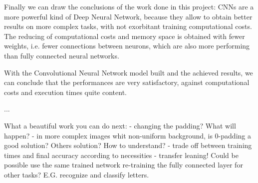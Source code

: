 Finally we can draw the conclusions of the work done in this project: \acsp{CNN} are a more powerful kind of Deep Neural Network, because they allow to obtain better results on more complex tasks, with not exorbitant training computational costs. The reducing of computational costs and memory space is obtained with fewer weights, i.e. fewer connections between neurons, which are also more performing than fully connected neural networks.

With the Convolutional Neural Network model built and the achieved results, we can conclude that the performances are very satisfactory, against computational costs and execution times quite content.

...

What a beautiful work you can do next:
- changing the padding? What will happen?
- in more complex images whit non-uniform background, is 0-padding a good solution? Others solution? How to understand?
- trade off between training times and final accuracy according to necessities
- transfer leaning! Could be possible use the same trained network re-training the fully connected layer for other tasks? E.G. recognize and classify letters.